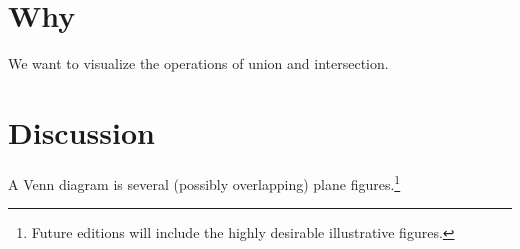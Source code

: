 
\section*{Why}

We want to visualize the operations of union and intersection.

\section*{Discussion}

A Venn diagram is several (possibly overlapping) plane figures.\footnote{Future editions will include the highly desirable illustrative figures.}

\blankpage